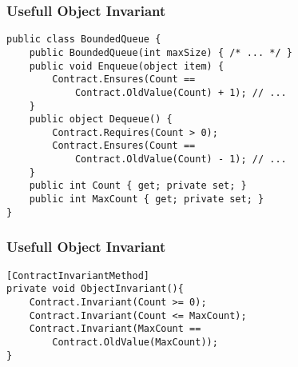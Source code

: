 \begin{frame}[fragile]
    \frametitle{Usefull Object Invariant}

    \begin{verbatim}
public class BoundedQueue {
    public BoundedQueue(int maxSize) { /* ... */ }
    public void Enqueue(object item) {
        Contract.Ensures(Count ==
            Contract.OldValue(Count) + 1); // ...
    }
    public object Dequeue() {
        Contract.Requires(Count > 0);
        Contract.Ensures(Count ==
            Contract.OldValue(Count) - 1); // ...
    }
    public int Count { get; private set; }
    public int MaxCount { get; private set; }
}
    \end{verbatim}
\end{frame}

\begin{frame}[fragile]
    \frametitle{Usefull Object Invariant}

    \begin{verbatim}
[ContractInvariantMethod]
private void ObjectInvariant(){
    Contract.Invariant(Count >= 0);
    Contract.Invariant(Count <= MaxCount);
    Contract.Invariant(MaxCount ==
        Contract.OldValue(MaxCount));
}
    \end{verbatim}
\end{frame}



